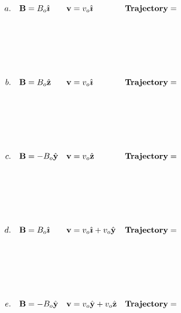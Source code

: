 \documentclass{article}
\newcommand{\ihat}[0]{\hat{\boldsymbol{\imath}}}
\newcommand{\yhat}[0]{\hat{\mathbf{y}}}
\newcommand{\zhat}[0]{\hat{\mathbf{z}}}
\begin{document}
\begin{equation}
\begin{align*}
a.\quad & \mathbf{B} =  B_o\ihat&  \mathbf{v} &= v_o\ihat & & \bf{Trajectory =} \\\\\\\\ \\\\
b.\quad & \mathbf{B} =  B_o\zhat &  \mathbf{v} & = v_o\ihat& &  \bf{Trajectory =} \\\\\\\\ \\\\
c.\quad  & \mathbf{B} = -B_o\yhat & \mathbf{v} & = v_o\zhat& & \bf{Trajectory =} \\\\\\\\ \\\\
d.\quad  & \mathbf{B} = B_o\ihat & \mathbf{v} & = v_o\ihat+v_o\yhat& &\bf{Trajectory =}\\\\\\\\ \\\\
e.\quad  & \mathbf{B} = -B_o\yhat & \mathbf{v} & = v_o\yhat+v_o\zhat& & \bf{Trajectory =} & 
\end{align*}
\end{equation}
\fi
\end{document}
